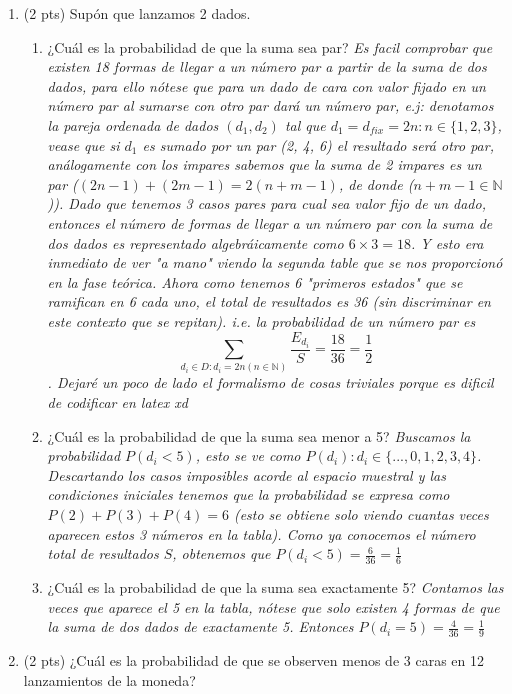 \documentclass{article}
\begin{document}
\begin{enumerate}
    \item (2 pts) Supón que lanzamos 2 dados.
    \begin{enumerate}
        \item[a)] ¿Cuál es la probabilidad de que la suma sea par?
        \textit{Es facil comprobar que existen 18 formas de llegar a un número par a partir de la suma de dos dados, para ello nótese que para un dado de cara con valor fijado en un número par al sumarse con otro par dará un número par, e.j: denotamos la pareja ordenada de dados $(d_1,d_2)$ tal que $d_1=d_{fix}=2n :n\in \{ 1,2,3 \}$, vease que si $d_1$ es sumado por un par (2, 4, 6) el resultado será otro par, análogamente con los impares sabemos que la suma de 2 impares es un par ($(2n-1) + (2m-1) = 2(n+m-1)$, de donde ($n+m-1\in\mathbb{N}$)). Dado que tenemos 3 casos pares para cual sea valor fijo de un dado, entonces el número de formas de llegar a un número par con la suma de dos dados es representado algebráicamente como $6 \times 3=18$. Y esto era inmediato de ver "a mano" viendo la segunda table que se nos proporcionó en la fase teórica. Ahora como tenemos 6 "primeros estados" que se ramifican en 6 cada uno, el total de resultados es 36 (sin discriminar en este contexto que se repitan). i.e. la probabilidad de un número par es
        $$\sum_{d_i \in D:d_i=2n (n\in\mathbb{N})} \frac{E_{d_i}}{S} = \frac{18}{36} = \frac{1}{2}$$. Dejaré un poco de lado el formalismo de cosas triviales porque es dificil de codificar en latex xd}
        \item[b)] ¿Cuál es la probabilidad de que la suma sea menor a 5?
        \textit{Buscamos la probabilidad $P(d_i<5)$, esto se ve como $P(d_i):d_i\in\{ ...,0,1,2,3,4\}$. Descartando los casos imposibles acorde al espacio muestral y las condiciones iniciales tenemos que la probabilidad se expresa como $P(2)+P(3)+P(4)=6$ (esto se obtiene solo viendo cuantas veces aparecen estos 3 números en la tabla). Como ya conocemos el número total de resultados $S$, obtenemos que $P(d_i<5) = \frac{6}{36} = \frac{1}{6}$}
        \item[c)] ¿Cuál es la probabilidad de que la suma sea exactamente 5?
        \textit{Contamos las veces que aparece el 5 en la tabla, nótese que solo existen 4 formas de que la suma de dos dados de exactamente 5. Entonces $P(d_i=5) = \frac{4}{36} = \frac{1}{9}$}
    \end{enumerate}
    
    \item (2 pts) ¿Cuál es la probabilidad de que se observen menos de 3 caras en 12 lanzamientos de la moneda?
    


\end{enumerate}
\end{document}
